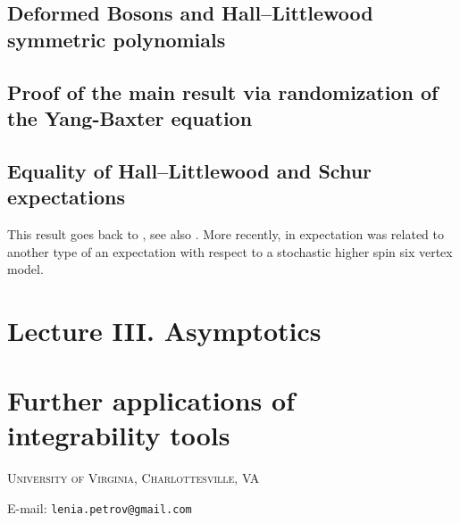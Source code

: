 \documentclass[letterpaper,11pt,oneside,reqno]{article}
\numberwithin{equation}{section}
\theoremstyle{definition}
\theoremstyle{remark}
\begin{document}
\subsection{Deformed Bosons and Hall--Littlewood symmetric polynomials}
\label{sub:fused_higher_spin}

\subsection{Proof of the main result via randomization of the Yang-Baxter equation}
\label{sub:HL_matching}


\subsection{Equality of Hall--Littlewood and Schur expectations}
\label{sub:equality_of_expectations}

This result goes back to 
\cite{kirillov1999q}, see also \cite{warnaar2008bisymmetric}. 
More recently, in \cite{borodin2016stochastic_MM} 
expectation was related to another type of an expectation
with respect to a stochastic higher spin six vertex model.



\newpage
\section{Lecture III. Asymptotics}
\label{sec:asymptotics}




\newpage
\appendix
\section{Further applications of integrability tools}
\label{appendix:further_reading}




\newpage



\medskip

\textsc{University of Virginia, Charlottesville, VA}

E-mail: \texttt{lenia.petrov@gmail.com}
\end{document}
